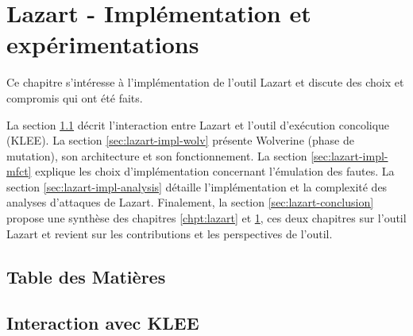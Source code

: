 \chapter{Lazart - Implémentation et expérimentations}
\label{chpt:lazart-implem}


    Ce chapitre s'intéresse à l'implémentation de l'outil Lazart et discute des choix et compromis qui ont été faits.
    
    La section \ref{sec:lazart-impl-klee} décrit l'interaction entre Lazart et l'outil d'exécution concolique (KLEE).
    La section \ref{sec:lazart-impl-wolv} présente Wolverine (phase de mutation), son architecture et son fonctionnement.
    La section \ref{sec:lazart-impl-mfct} explique les choix d'implémentation concernant l'émulation des fautes.
    La section \ref{sec:lazart-impl-analysis} détaille l'implémentation et la complexité des analyses d'attaques de Lazart.
    Finalement, la section \ref{sec:lazart-conclusion} propose une synthèse des chapitres \ref{chpt:lazart} et \ref{chpt:lazart-implem}, ces deux chapitres sur l'outil Lazart et revient sur les contributions et les perspectives de l'outil.

    \setcounter{tocdepth}{2}
    \section*{Table des Matières}
    \localtableofcontents
    
    \section{Interaction avec KLEE}
    \label{sec:lazart-impl-klee}
    
